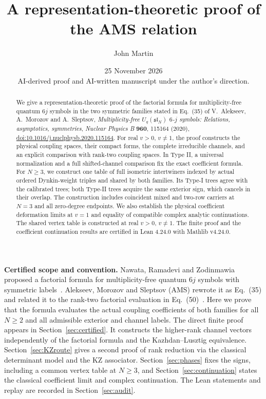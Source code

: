 \documentclass[10pt,a4paper]{article}
\title{A representation-theoretic proof of the AMS relation}
\author{John Martin}
\date{25 November 2026\\[0.5em]
  {\small AI-derived proof and AI-written manuscript under the author's direction.}}
\newenvironment{revision}{\begingroup}{\endgroup}
\begin{document}
\begin{revision}
\maketitle
\begin{abstract}
We give a representation-theoretic proof of the factorial formula for
multiplicity-free quantum $6j$ symbols in the two symmetric families
stated in Eq.~(35) of V.~Alekseev, A.~Morozov and A.~Sleptsov,
\emph{Multiplicity-free $U_q(\mathfrak{sl}_N)$ $6$-$j$ symbols:
Relations, asymptotics, symmetries}, \emph{Nuclear Physics B}
\textbf{960}, 115164 (2020),
\href{https://doi.org/10.1016/j.nuclphysb.2020.115164}{doi:10.1016/j.nuclphysb.2020.115164}.
For real $v>0$, $v\ne1$, the proof constructs the physical coupling
spaces, their compact forms, the complete irreducible channels, and
an explicit comparison with rank-two coupling spaces. In Type II,
a universal normalization and a full shifted-channel comparison fix
the exact coefficient formula. For $N\ge3$, we construct one table
of full isometric intertwiners indexed by actual ordered Dynkin-weight
triples and shared by both families. Its Type-I trees agree with the
calibrated trees; both Type-II trees acquire the same exterior sign,
which cancels in their overlap. The construction includes coincident
mixed and two-row carriers at $N=3$ and all zero-degree endpoints.
We also establish the physical coefficient deformation limits at
$v=1$ and equality of compatible complex analytic continuations.
The shared vertex table is constructed at real $v>0$, $v\ne1$.
The finite proof and the coefficient continuation results are certified
in Lean 4.24.0 with Mathlib v4.24.0.
\end{abstract}
\end{revision}

\begin{revision}
\noindent\textbf{Certified scope and convention.}
Nawata, Ramadevi and Zodinmawia proposed a factorial formula for
multiplicity-free quantum $6j$ symbols with symmetric labels~\cite{NRZ}.
Alekseev, Morozov and Sleptsov (AMS) rewrote it as Eq.~(35) and related it
to the rank-two factorial evaluation in Eq.~(50)~\cite{AMS}. Here we prove
that the formula evaluates the actual coupling coefficients of both families
for all $N\ge2$ and all admissible exterior and channel labels.
The direct finite proof appears in Section~\ref{sec:certified}. It
constructs the higher-rank channel vectors independently of the factorial
formula and the Kazhdan--Lusztig equivalence. Section~\ref{sec:KZroute}
gives a second proof of rank reduction via the classical determinant
model and the KZ associator. Section~\ref{sec:phases} fixes the signs,
including a common vertex table at $N\ge3$, and
Section~\ref{sec:continuation} states the classical coefficient limit and
complex continuation. The Lean statements and replay are recorded in
Section~\ref{sec:audit}.
\end{revision}
\end{document}
